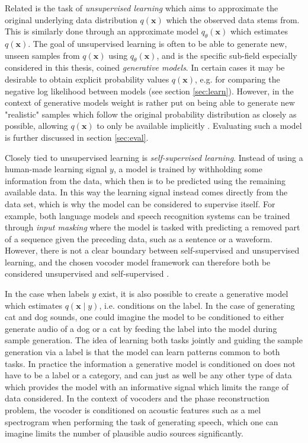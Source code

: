 \documentclass{report}
\begin{document}
Related is the task of \textit{unsupervised learning} which aims to approximate the original underlying data distribution $q(\bm{x})$ which the observed data stems from. This is similarly done through an approximate model $q_{\theta}(\bm{x})$ which estimates $q(\bm{x})$. The goal of unsupervised learning is often to be able to generate new, unseen samples from $q(\bm{x})$ using $q_{\theta}(\bm{x})$, and is the specific sub-field especially considered in this thesis, coined \textit{generative models}. In certain cases it may be desirable to obtain explicit probability values $q(\bm{x})$, e.g. for comparing the negative log likelihood between models (see section \ref{sec:learn}). However, in the context of generative models weight is rather put on being able to generate new "realistic" samples which follow the original probability distribution as closely as possible, allowing $q(\bm{x})$ to only be available implicitly \cite{foster2019generative}. Evaluating such a model is further discussed in section \ref{sec:eval}.

Closely tied to unsupervised learning is \textit{self-supervised learning}. Instead of using a human-made learning signal $y$, a model is trained by withholding some information from the data, which then is to be predicted using the remaining available data. In this way the learning signal instead comes directly from the data set, which is why the model can be considered to supervise itself. For example, both language models and speech recognition systems can be trained through \textit{input masking} where the model is tasked with predicting a removed part of a sequence given the preceding data, such as a sentence or a waveform. However, there is not a clear boundary between self-supervised and unsupervised learning, and the chosen vocoder model framework can therefore both be considered unsupervised and self-supervised \cite{baevski2020wav2vec, devlin2018bert}.

In the case when labels $y$ exist, it is also possible to create a generative model which estimates $q(\bm{x} \mid y)$, i.e. conditions on the label. In the case of generating cat and dog sounds, one could imagine the model to be conditioned to either generate audio of a dog or a cat by feeding the label into the model during sample generation. The idea of learning both tasks jointly and guiding the sample generation via a label is that the model can learn patterns common to both tasks. In practice the information a generative model is conditioned on does not have to be a label or a category, and can just as well be any other type of data which provides the model with an informative signal which limits the range of data considered. In the context of vocoders and the phase reconstruction problem, the vocoder is conditioned on acoustic features such as a mel spectrogram when performing the task of generating speech, which one can imagine limits the number of plausible audio sources significantly.
\end{document}
